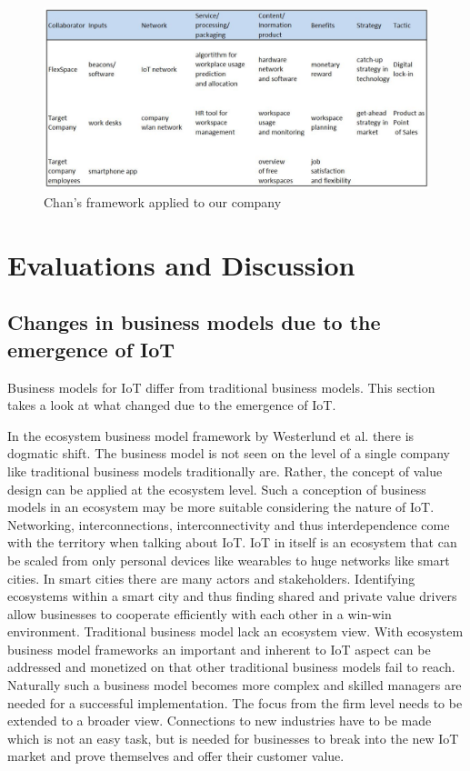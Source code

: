 	\begin{figure}[ht]
	    \begin{center}
	    \includegraphics[scale=0.55]{Talk11/chanexampleusecase.jpg}
	    \end{center}
	    \caption{Chan's framework applied to our company}
	    \label{use case chan}
    \end{figure}

		

\section{Evaluations and Discussion}
	\subsection{Changes in business models due to the emergence of IoT}
\label{sec:eval}
	Business models for IoT differ from traditional business models. This section takes a look at what changed due to the emergence of IoT.

	In the ecosystem business model framework by Westerlund et al. \cite{westerlund} there is dogmatic shift. The business model is not seen on the level of a single company like traditional business models traditionally are. Rather, the concept of value design can be applied at the ecosystem level. Such a conception of business models in an ecosystem may be more suitable considering the nature of IoT. Networking, interconnections, interconnectivity and thus interdependence come with the territory when talking about IoT. IoT in itself is an ecosystem that can be scaled from only personal devices like wearables to huge networks like smart cities. In smart cities there are many actors and stakeholders. Identifying ecosystems within a smart city and thus finding shared and private value drivers allow businesses to cooperate efficiently with each other in a win-win environment. Traditional business model lack an ecosystem view. With ecosystem business model frameworks an important and inherent to IoT aspect can be addressed and monetized on that other traditional business models fail to reach. Naturally such a business model becomes more complex and skilled managers are needed for a successful implementation. The focus from the firm level needs to be extended to a broader view. Connections to new industries have to be made which is not an easy task, but is needed for businesses to break into the new IoT market and prove themselves and offer their customer value.

